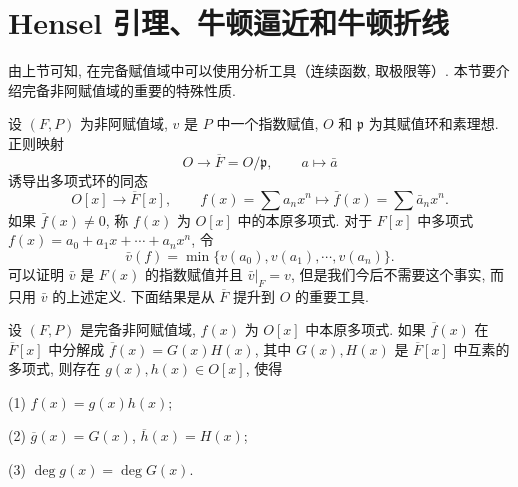 \section{Hensel 引理、牛顿逼近和牛顿折线}\label{sec:ch8-s2}

由上节可知, 在完备赋值域中可以使用分析工具（连续函数, 取极限等）. 本节要介绍完备非阿赋值域的重要的特殊性质.

设 $(F,P)$ 为非阿赋值域, $v$ 是 $P$ 中一个指数赋值, $O$ 和 $\mathfrak{p}$ 为其赋值环和素理想. 正则映射
\[
  O\to\overline{F}=O/\mathfrak{p},\qquad a\mapsto\bar{a}
\]
诱导出多项式环的同态
\[
  O[x]\to\overline{F}[x],\qquad f(x)=\sum a_nx^n\mapsto\bar{f}(x)=\sum\bar{a}_nx^n.
\]
如果 $\bar{f}(x)\neq 0$, 称 $f(x)$ 为 $O[x]$ 中的本原多项式. 对于 $F[x]$ 中多项式 $f(x)=a_0+a_1x+\cdots+a_nx^n$, 令
\[
  \bar{v}(f)=\min\{v(a_0),v(a_1),\cdots,v(a_n)\}.
\]
可以证明 $\bar{v}$ 是 $F(x)$ 的指数赋值并且 $\bar{v}|_F=v$, 但是我们今后不需要这个事实, 而只用 $\bar{v}$ 的上述定义. 下面结果是从 $\overline{F}$ 提升到 $O$ 的重要工具.

\begin{theorem}\label{thm:8.6}
设 $(F,P)$ 是完备非阿赋值域, $f(x)$ 为 $O[x]$ 中本原多项式. 如果 $\overline{f}(x)$ 在 $\overline{F}[x]$ 中分解成 $\overline{f}(x)=G(x)H(x)$, 其中 $G(x),H(x)$ 是 $\overline{F}[x]$ 中互素的多项式, 则存在 $g(x),h(x)\in O[x]$, 使得

(1) $f(x)=g(x)h(x)$;

(2) $\overline{g}(x)=G(x)$, $\overline{h}(x)=H(x)$;

(3) $\deg g(x)=\deg G(x)$.
\end{theorem}

